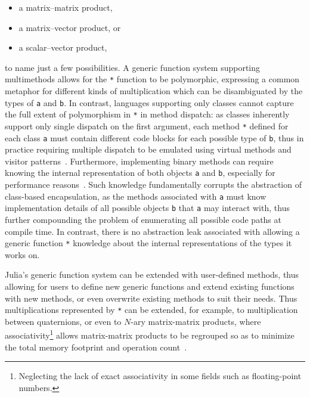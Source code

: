 \documentclass[pldi]{sigplanconf-pldi15}
\begin{document}
\begin{itemize}
	\item a matrix--matrix product,
	\item a matrix--vector product, or
	\item a scalar--vector product,
\end{itemize}
%
to name just a few possibilities. A generic function system supporting
multimethods allows for the \verb|*| function to be polymorphic, expressing a
common metaphor for different kinds of multiplication which can be
disambiguated by the types of \verb|a| and \verb|b|. In contrast, languages
supporting only classes cannot capture the full extent of polymorphism in
\verb|*| in method dispatch: as classes inherently support only single dispatch
on the first argument, each method \verb|*| defined for each class \verb|a|
must contain different code blocks for each possible type of \verb|b|, thus in
practice requiring multiple dispatch to be emulated using virtual methods and
visitor patterns~\cite{Gamma1994}. Furthermore, implementing binary methods can
require knowing the internal representation of both objects \verb|a| and
\verb|b|, especially for performance reasons~\cite{Bruce1995}. Such knowledge
fundamentally corrupts the abstraction of class-based encapsulation, as the
methods associated with \verb|a| must know implementation details of all
possible objects \verb|b| that \verb|a| may interact with, thus further
compounding the problem of enumerating all possible code paths at compile time.
In contrast, there is no abstraction leak associated with allowing a generic
function \verb|*| knowledge about the internal representations of the types it
works on.

Julia's generic function system can be extended with user-defined methods, thus
allowing for users to define new generic functions and extend existing
functions with new methods, or even overwrite existing methods to suit their
needs. Thus multiplications represented by \verb|*| can be extended, for
example, to multiplication between quaternions, or even to $N$-ary
matrix-matrix products, where associativity\footnote{Neglecting the lack of
exact associativity in some fields such as floating-point numbers.} allows
matrix-matrix products to be regrouped so as to minimize the total memory
footprint and operation count~\cite{Hu1984}.
\end{document}
